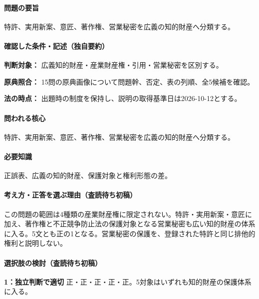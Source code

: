 \paragraph{問題の要旨} 特許、実用新案、意匠、著作権、営業秘密を広義の知的財産へ分類する。

\paragraph{確認した条件・記述（独自要約）}\mbox{}\par

\noindent\textbf{判断対象：} 広義知的財産・産業財産権・引用・営業秘密を区別する。\par

\noindent\textbf{原典照合：} 15問の原典画像について問題幹、否定、表の列順、全5候補を確認。\par

\noindent\textbf{法の時点：} 出題時の制度を保持し、説明の取得基準日は2026-10-12とする。\par

\paragraph{問われる核心} 特許、実用新案、意匠、著作権、営業秘密を広義の知的財産へ分類する。

\paragraph{必要知識} 正誤表、広義の知的財産、保護対象と権利形態の差。

\paragraph{考え方・正答を選ぶ理由（査読待ち初稿）} この問題の範囲は4種類の産業財産権に限定されない。特許・実用新案・意匠に加え、著作権と不正競争防止法の保護対象となる営業秘密も広い知的財産の体系に入る。5文とも正の1となる。営業秘密の保護を、登録された特許と同じ排他的権利と説明しない。

\paragraph{選択肢の検討（査読待ち初稿）}\mbox{}\par

\noindent\textbf{1：独立判断で適切} 正・正・正・正・正。5対象はいずれも知的財産の保護体系に入る。\par

